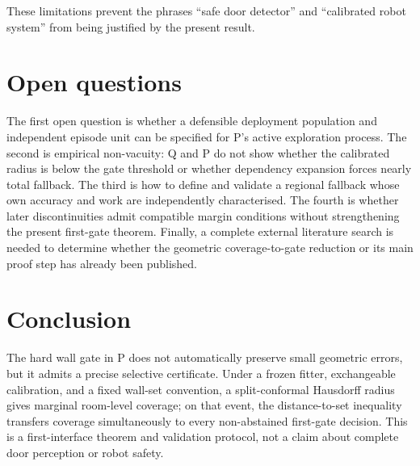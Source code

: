 \documentclass{article}
\begin{document}
These limitations prevent the phrases ``safe door detector'' and ``calibrated robot system'' from being justified by the present result. %

\section{Open questions}
\label{sec:open}

The first open question is whether a defensible deployment population and independent episode unit can be specified for P's active exploration process. %
The second is empirical non-vacuity: Q and P do not show whether the calibrated radius is below the gate threshold or whether dependency expansion forces nearly total fallback. %
The third is how to define and validate a regional fallback whose own accuracy and work are independently characterised. %
The fourth is whether later discontinuities admit compatible margin conditions without strengthening the present first-gate theorem. %
Finally, a complete external literature search is needed to determine whether the geometric coverage-to-gate reduction or its main proof step has already been published.

\section{Conclusion}

The hard wall gate in P does not automatically preserve small geometric errors, but it admits a precise selective certificate. %
Under a frozen fitter, exchangeable calibration, and a fixed wall-set convention, a split-conformal Hausdorff radius gives marginal room-level coverage; on that event, the distance-to-set inequality transfers coverage simultaneously to every non-abstained first-gate decision. %
This is a first-interface theorem and validation protocol, not a claim about complete door perception or robot safety. %



\end{document}
